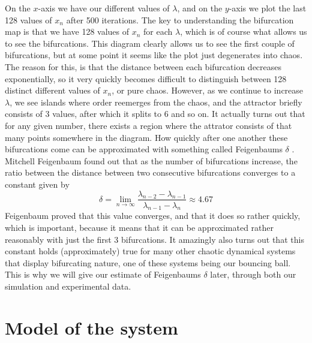 \documentclass[12pt,oneside,a4paper]{article}
\numberwithin{equation}{section}
\begin{document}
{{{{On the $x$-axis we have our different values of $\lambda$, and on the $y$-axis we plot the last 128 values of $x_n$ after 500 iterations. The key to understanding the bifurcation map is that we have 128 values of $x_n$ for each $\lambda$, which is of course what allows us to see the bifurcations. This diagram clearly allows us to see the first couple of bifurcations, but at some point it seems like the plot just degenerates into chaos. The reason for this, is that the distance between each bifurcation decreases exponentially, so it very quickly becomes difficult to distinguish between 128 distinct different values of $x_n$, or pure chaos. However, as we continue to increase $\lambda$, we see islands where order reemerges from the chaos, and the attractor briefly consists of 3 values, after which it splits to 6 and so on. It actually turns out that for any given number, there exists a region where the attrator consists of that many points somewhere in the diagram. How quickly after one another these bifurcations come can be approximated with something called Feigenbaums $\delta$ \cite{strogatz}. Mitchell Feigenbaum found out that as the number of bifurcations increase, the ratio between the distance between two consecutive bifurcations converges to a constant given by
\begin{equation}
\delta=\lim_{n \to \infty} \frac{\lambda_{n-2} - \lambda_{n-1}}{\lambda_{n-1}-\lambda_n} \approx 4.67 \label{Feigenbaumsdelta}
\end{equation}
Feigenbaum proved that this value converges, and that it does so rather quickly, which is important, because it means that it can be approximated rather reasonably with just the first 3 bifurcations. It amazingly also turns out that this constant holds (approximately) true for many other chaotic dynamical systems that display bifurcating nature, one of these systems being our bouncing ball. This is why we will give our estimate of Feigenbaums $\delta$ later, through both our simulation and experimental data.
\section{Model of the system}
\label{modelling}
}}}}
\end{document}
